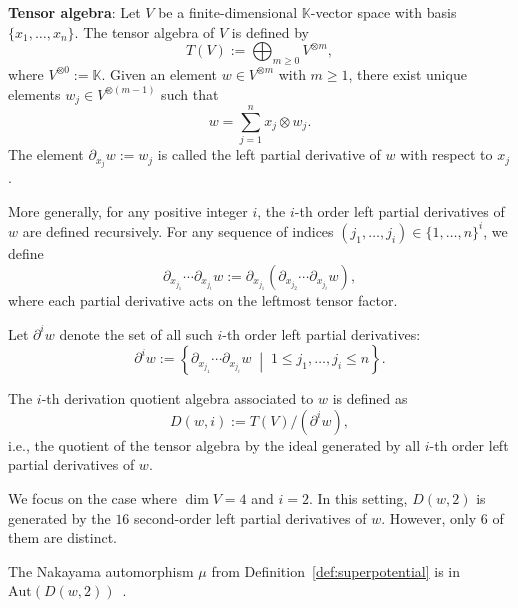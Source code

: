 \documentclass{amsart}
\begin{document}
\begin{definition}
\textbf{Tensor algebra}\label{def:derivationquotient-alg}:
Let $V$ be a finite-dimensional $\mathbb{K}$-vector space with basis $\{ x_1, \dots, x_n \}$. The tensor algebra of $V$ is defined by
$$ T(V) := \bigoplus_{m \geq 0} V^{\otimes m},$$
where $V^{\otimes 0} := \mathbb{K}$.
Given an element $w \in V^{\otimes m}$ with $m \geq 1$, there exist unique elements $w_j \in V^{\otimes (m-1)}$ such that
\[
w = \sum_{j=1}^n x_j \otimes w_j.
\]
The element $\partial_{x_j} w := w_j$ is called the left partial derivative of $w$ with respect to $x_j$.

More generally, for any positive integer $i$, the $i$-th order left partial derivatives of $w$ are defined recursively. For any sequence of indices $(j_1, \dots, j_i) \in \{1, \dots, n\}^i$, we define
\[
\partial_{x_{j_1}} \cdots \partial_{x_{j_i}} w := \partial_{x_{j_1}} \left( \partial_{x_{j_2}} \cdots \partial_{x_{j_i}} w \right),
\]
where each partial derivative acts on the leftmost tensor factor.

Let $\partial^i w$ denote the set of all such $i$-th order left partial derivatives:
\[
\partial^i w := \left\{ \partial_{x_{j_1}} \cdots \partial_{x_{j_i}} w \;\middle|\; 1 \leq j_1, \dots, j_i \leq n \right\}.
\]

The $i$-th derivation quotient algebra associated to $w$ is defined as
\[
D(w, i) := T(V) \big/ \left( \partial^i w \right),
\]
i.e., the quotient of the tensor algebra by the ideal generated by all $i$-th order left partial derivatives of $w$.

We focus on the case where $\dim V = 4$ and $i = 2$. In this setting, $D(w,2)$ is generated by the $16$ second-order left partial derivatives of $w$. However, only $6$ of them are distinct.

The Nakayama automorphism $\mu$ from Definition~\ref{def:superpotential} is in $\mathrm{Aut}(D(w,2))$~\cite[Thm.~1.10]{Mori_Izuru_Smith}.
\end{definition}
\end{document}
